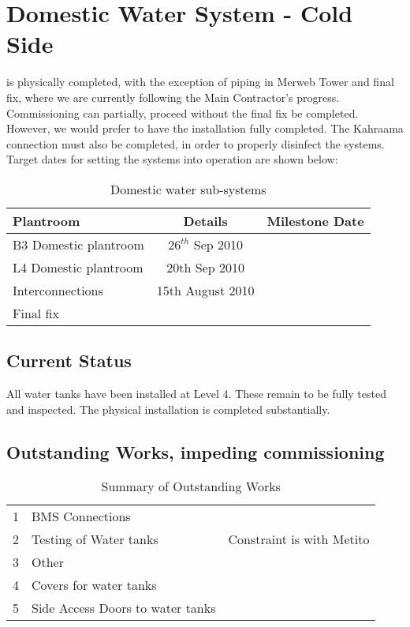 \chapter{Domestic Water System - Cold Side}

 is physically completed, with the exception of piping in Merweb Tower and final fix, where we are currently following the Main Contractor's progress. Commissioning can partially, proceed without the final fix be completed. However, we would prefer to have the installation fully completed. The Kahraama connection must also be completed, in order to properly disinfect the systems. Target dates for setting the systems into operation are shown below:

\begin{center}
           \begin{table} 
	    \begin{tabular}{lcl}
	      \toprule
	      Plantroom   &  Details & Milestone Date  \\
	      \midrule
	      B3 Domestic plantroom      &  $26^{th}$ Sep 2010  \\
	      L4 Domestic plantroom      &  20th Sep 2010  \\
	      Interconnections           &  15th August 2010  \\
	      Final fix  && \\ 
	      \bottomrule
	    \end{tabular}
           \caption{Domestic water sub-systems}
            \end{table}
   \end{center}


\section{Current Status}

All water tanks have been installed at Level 4. These remain to be fully tested and inspected. The physical installation is completed substantially. 

\section{Outstanding Works, impeding commissioning}

\begin{table}[ht]
\begin{tabular}{lll}
1  &BMS Connections & \\
2  &Testing of Water tanks &Constraint is with Metito\\
3  &Other                  &\\
4  &Covers for water tanks &\\
5  &Side Access Doors to water tanks   &\\
\end{tabular}
\caption{Summary of Outstanding Works}
\end{table}

